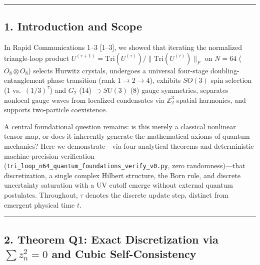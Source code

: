 \documentclass[
  a4paper,
]{article}
\begin{document}
\begin{center}\rule{0.5\linewidth}{0.5pt}\end{center}

\subsection{1. Introduction and Scope}\label{introduction-and-scope}

In Rapid Communications 1--3 {[}1--3{]}, we showed that iterating the
normalized triangle-loop product
\(U^{(\tau+1)} = \mathrm{Tri}(U^{(\tau)})/\|\mathrm{Tri}(U^{(\tau)})\|_F\)
on \(N = 64\) (\(O_8 \otimes O_8\)) selects Hurwitz crystals, undergoes
a universal four-stage doubling-entanglement phase transition (rank
\(1 \to 2 \to 4\)), exhibits \(SO(3)\) spin selection (\(1\)
vs.~\((1/3)^\tau\)) and \(G_2\) (\(14\)) \(\supset SU(3)\) (\(8\)) gauge
symmetries, separates nonlocal gauge waves from localized condensates
via \(\mathbb{Z}_2^3\) spatial harmonics, and supports two-particle
coexistence.

A central foundational question remains: is this merely a classical
nonlinear tensor map, or does it inherently generate the mathematical
axioms of quantum mechanics? Here we demonstrate---via four analytical
theorems and deterministic machine-precision verification
(\texttt{tri\_loop\_n64\_quantum\_foundations\_verify\_v0.py}, zero
randomness)---that discretization, a single complex Hilbert structure,
the Born rule, and discrete uncertainty saturation with a UV cutoff
emerge without external quantum postulates. Throughout, \(\tau\) denotes
the discrete update step, distinct from emergent physical time \(t\).

\begin{center}\rule{0.5\linewidth}{0.5pt}\end{center}

\subsection{\texorpdfstring{2. Theorem Q1: Exact Discretization via
\(\sum z_n^2 = 0\) and Cubic
Self-Consistency}{2. Theorem Q1: Exact Discretization via \textbackslash sum z\_n\^{}2 = 0 and Cubic Self-Consistency}}\label{theorem-q1-exact-discretization-via-sum-z_n2-0-and-cubic-self-consistency}
\end{document}
